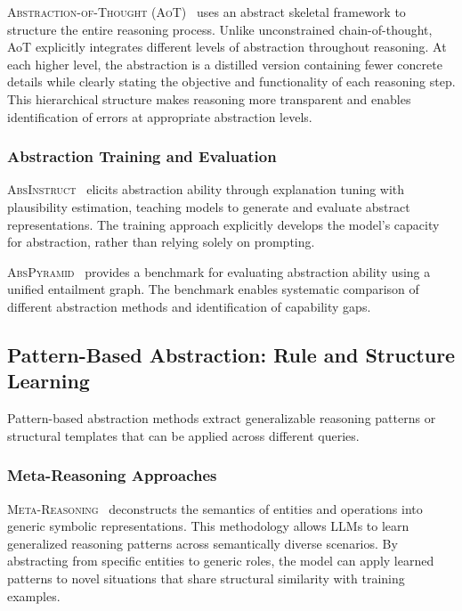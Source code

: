 \documentclass{article}
\begin{document}
\textsc{Abstraction-of-Thought (AoT)}~\citep{AoT} uses an abstract skeletal framework to structure the entire reasoning process. Unlike unconstrained chain-of-thought, AoT explicitly integrates different levels of abstraction throughout reasoning. At each higher level, the abstraction is a distilled version containing fewer concrete details while clearly stating the objective and functionality of each reasoning step. This hierarchical structure makes reasoning more transparent and enables identification of errors at appropriate abstraction levels.

\subsubsection{Abstraction Training and Evaluation}

\textsc{AbsInstruct}~\citep{AbsInstruct} elicits abstraction ability through explanation tuning with plausibility estimation, teaching models to generate and evaluate abstract representations. The training approach explicitly develops the model's capacity for abstraction, rather than relying solely on prompting.

\textsc{AbsPyramid}~\citep{AbsPyramid} provides a benchmark for evaluating abstraction ability using a unified entailment graph. The benchmark enables systematic comparison of different abstraction methods and identification of capability gaps.

\subsection{Pattern-Based Abstraction: Rule and Structure Learning}

Pattern-based abstraction methods extract generalizable reasoning patterns or structural templates that can be applied across different queries.

\subsubsection{Meta-Reasoning Approaches}

\textsc{Meta-Reasoning}~\citep{Meta-Reasoning} deconstructs the semantics of entities and operations into generic symbolic representations. This methodology allows LLMs to learn generalized reasoning patterns across semantically diverse scenarios. By abstracting from specific entities to generic roles, the model can apply learned patterns to novel situations that share structural similarity with training examples.
\end{document}
